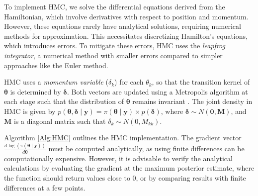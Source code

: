 To implement HMC, we solve the differential equations derived from the Hamiltonian, which involve derivatives with respect to position and momentum. However, these equations rarely have analytical solutions, requiring numerical methods for approximation. This necessitates discretizing Hamilton’s equations, which introduces errors. To mitigate these errors, HMC uses the \textit{leapfrog integrator}, a numerical method with smaller errors compared to simpler approaches like the Euler method.

HMC uses a \textit{momentum variable} (\(\delta_k\)) for each \(\theta_k\), so that the transition kernel of \(\bm{\theta}\) is determined by \(\bm{\delta}\). Both vectors are updated using a Metropolis algorithm at each stage such that the distribution of \(\bm{\theta}\) remains invariant \cite{neal2011mcmc}. The joint density in HMC is given by \( p(\bm{\theta}, \bm{\delta} \mid  \bm{y}) = \pi(\bm{\theta} \mid  \bm{y}) \times p(\bm{\delta}) \), where \(\bm{\delta} \sim N(\bm{0}, \bm{M})\), and \(\bm{M}\) is a diagonal matrix such that \(\delta_k \sim N(0, M_{kk})\). 

Algorithm \ref{Alg:HMC} outlines the HMC implementation. The gradient vector \(\frac{d\log(\pi(\bm{\theta}\mid \bm{y}))}{d\bm{\theta}}\) must be computed analytically, as using finite differences can be computationally expensive. However, it is advisable to verify the analytical calculations by evaluating the gradient at the maximum posterior estimate, where the function should return values close to 0, or by comparing results with finite differences at a few points. 

